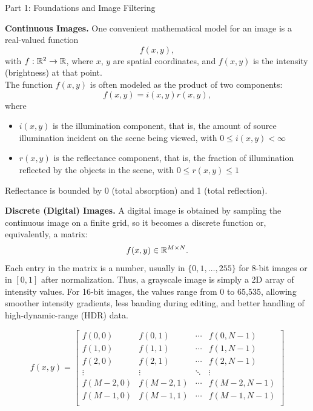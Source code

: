 \documentclass[letterpaper]{article}
\begin{document}
\begin{notes}{Part 1: Foundations and Image Filtering}



\textbf{Continuous Images.} One convenient mathematical model for an image is a real-valued function
$$f(x,y),$$
with $f: \mathbb{R}^2 \to \mathbb{R}$, where $x$, $y$ are spatial coordinates, and $f(x, y)$ is the intensity (brightness) at that point.\\

The function $f(x, y)$ is often modeled as the product of two components:
$$f(x, y) = i(x, y)r(x, y),$$
where
\begin{itemize}
    \item $i(x, y)$ is the illumination component, that is, the amount of source illumination incident on the scene being viewed, with $0\leq i(x,y) < \infty$
    \item $r(x, y)$ is the reflectance component, that is, the fraction of illumination reflected by the objects in the scene, with $0\leq r(x, y)\leq 1$
\end{itemize}
Reflectance is bounded by 0 (total absorption) and 1 (total reflection).





\textbf{Discrete (Digital) Images.} A digital image is obtained by sampling the continuous image on a finite grid, so it becomes a discrete function or, equivalently, a matrix:
$$f(x, y) \in \mathbb{R}^{M\times N}.$$
Each entry in the matrix is a number, usually in $\{0,1,\dots,255\}$ for 8-bit images or in $[0,1]$ after normalization. Thus, a grayscale image is simply a 2D array of intensity values. For 16-bit images, the values range from 0 to 65,535, allowing smoother intensity gradients, less banding during editing, and better handling of high-dynamic-range (HDR) data.

\[
f(x,y) = 
\begin{bmatrix}
f(0, 0) & f(0, 1) & \cdots & f(0, N-1)\\
f(1, 0) & f(1, 1) & \cdots & f(1, N-1)\\
f(2, 0) & f(2, 1) & \cdots & f(2, N-1)\\
\vdots & \vdots & \ddots & \vdots\\
f(M-2, 0) & f(M-2, 1) & \cdots & f(M-2, N-1)\\
f(M-1, 0) & f(M-1, 1) & \cdots & f(M-1, N-1)\\
\end{bmatrix}
\]


\end{notes}
\end{document}
